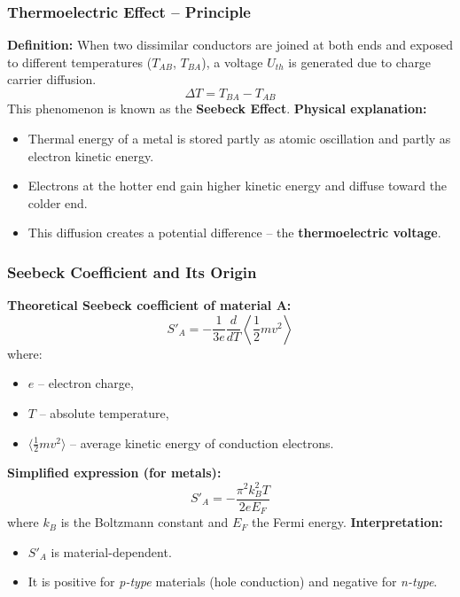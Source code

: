 \begin{frame}
	\frametitle{Thermoelectric Effect -- Principle}
    \small
    \textbf{Definition:}
    When two dissimilar conductors are joined at both ends and exposed to different temperatures
    ($T_{AB}$, $T_{BA}$), a voltage $U_{th}$ is generated due to charge carrier diffusion.
    \begin{equation}
        \Delta T = T_{BA} - T_{AB}
    \end{equation}
    This phenomenon is known as the \textbf{Seebeck Effect}.
    \textbf{Physical explanation:}
    \begin{itemize}
        \item Thermal energy of a metal is stored partly as atomic oscillation and partly as electron kinetic energy.
        \item Electrons at the hotter end gain higher kinetic energy and diffuse toward the colder end.
        \item This diffusion creates a potential difference -- the \textbf{thermoelectric voltage}.
    \end{itemize}
\end{frame}

\begin{frame}
	\frametitle{Seebeck Coefficient and Its Origin}
    \small
    \textbf{Theoretical Seebeck coefficient of material A:}
    \begin{equation}
        S'_A = -\frac{1}{3e} \frac{d}{dT} \left\langle \frac{1}{2} m v^2 \right\rangle
    \end{equation}
    where:
    \begin{itemize}
        \item $e$ – electron charge,
        \item $T$ – absolute temperature,
        \item $\langle \frac{1}{2} m v^2 \rangle$ – average kinetic energy of conduction electrons.
    \end{itemize}
    \textbf{Simplified expression (for metals):}
    \begin{equation}
        S'_A = -\frac{\pi^2 k_B^2 T}{2 e E_F}
    \end{equation}
    where $k_B$ is the Boltzmann constant and $E_F$ the Fermi energy.
    \textbf{Interpretation:}
    \begin{itemize}
        \item $S'_A$ is material-dependent.
        \item It is positive for \textit{p-type} materials (hole conduction) and negative for \textit{n-type}.
    \end{itemize}
\end{frame}

